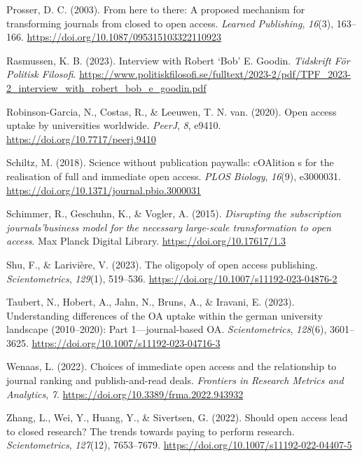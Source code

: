 \documentclass[a4paper,man,floatsintext,longtable,noextraspace,12pt]{apa6}
\newenvironment{CSLReferences}%
  {}%
  {\par}
\begin{document}
\begin{CSLReferences}{1}{0}
\leavevmode{}%
Prosser, D. C. (2003). From here to there: A proposed mechanism for
transforming journals from closed to open access. \emph{Learned
Publishing}, \emph{16}(3), 163--166.
\url{https://doi.org/10.1087/095315103322110923}

\leavevmode{}%
Rasmussen, K. B. (2023). Interview with {Robert {`Bob'} E. Goodin}.
\emph{Tidskrift För Politisk Filosofi}.
\url{https://www.politiskfilosofi.se/fulltext/2023-2/pdf/TPF_2023-2_interview_with_robert_bob_e_goodin.pdf}

\leavevmode{}%
Robinson-Garcia, N., Costas, R., \& Leeuwen, T. N. van. (2020). Open
access uptake by universities worldwide. \emph{{PeerJ}}, \emph{8},
e9410. \url{https://doi.org/10.7717/peerj.9410}

\leavevmode{}%
Schiltz, M. (2018). Science without publication paywalls: cOAlition s
for the realisation of full and immediate open access. \emph{PLOS
Biology}, \emph{16}(9), e3000031.
\url{https://doi.org/10.1371/journal.pbio.3000031}

\leavevmode{}%
Schimmer, R., Geschuhn, K., \& Vogler, A. (2015). \emph{{Disrupting the
subscription journals'business model for the necessary large-scale
transformation to open access}}. Max Planck Digital Library.
\url{https://doi.org/10.17617/1.3}

\leavevmode{}%
Shu, F., \& Larivière, V. (2023). The oligopoly of open access
publishing. \emph{Scientometrics}, \emph{129}(1), 519--536.
\url{https://doi.org/10.1007/s11192-023-04876-2}

\leavevmode{}%
Taubert, N., Hobert, A., Jahn, N., Bruns, A., \& Iravani, E. (2023).
Understanding differences of the OA uptake within the german university
landscape (2010--2020): Part 1---journal-based OA.
\emph{Scientometrics}, \emph{128}(6), 3601--3625.
\url{https://doi.org/10.1007/s11192-023-04716-3}

\leavevmode{}%
Wenaas, L. (2022). Choices of immediate open access and the relationship
to journal ranking and publish-and-read deals. \emph{Frontiers in
Research Metrics and Analytics}, \emph{7}.
\url{https://doi.org/10.3389/frma.2022.943932}

\leavevmode{}%
Zhang, L., Wei, Y., Huang, Y., \& Sivertsen, G. (2022). Should open
access lead to closed research? The trends towards paying to perform
research. \emph{Scientometrics}, \emph{127}(12), 7653--7679.
\url{https://doi.org/10.1007/s11192-022-04407-5}

\end{CSLReferences}
\end{document}
